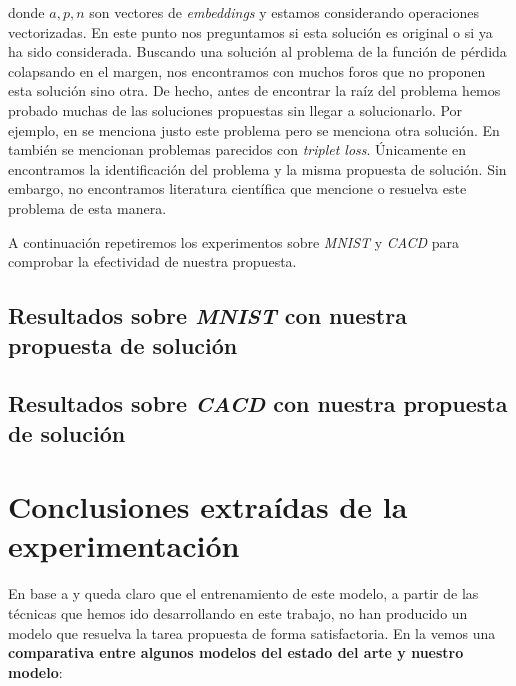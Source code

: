 donde $a, p, n$ son vectores de \textit{embeddings} y estamos considerando operaciones vectorizadas. En este punto nos preguntamos si esta solución es original o si ya ha sido considerada. Buscando una solución al problema de la función de pérdida colapsando en el margen, nos encontramos con muchos foros que no proponen esta solución sino otra. De hecho, antes de encontrar la raíz del problema hemos probado muchas de las soluciones propuestas sin llegar a solucionarlo. Por ejemplo, en \cite{informatica:respuesta_erronea_problema} se menciona justo este problema pero se menciona otra solución. En \cite{informatica:github_issue_problema_tripletloss} también se mencionan problemas parecidos con \textit{triplet loss}. Únicamente en \cite{informatica:solucion_triplet_loss} encontramos la identificación del problema y la misma propuesta de solución. Sin embargo, no encontramos literatura científica que mencione o resuelva este problema de esta manera.

A continuación repetiremos los experimentos sobre \textit{MNIST} y \textit{CACD} para comprobar la efectividad de nuestra propuesta.

\subsection{Resultados sobre \textit{MNIST} con nuestra propuesta de solución} \label{isubsec:experimentacion_mnist_bien}

\subsection{Resultados sobre \textit{CACD} con nuestra propuesta de solución} \label{isubsec:experimentacion_cacd_bien}

\section{Conclusiones extraídas de la experimentación} \label{isec:conclusiones_experimentacion}

En base a  y  queda claro que el entrenamiento de este modelo, a partir de las técnicas que hemos ido desarrollando en este trabajo, no han producido un modelo que resuelva la tarea propuesta de forma satisfactoria. En la  vemos una \textbf{comparativa entre algunos modelos del estado del arte y nuestro modelo}:

